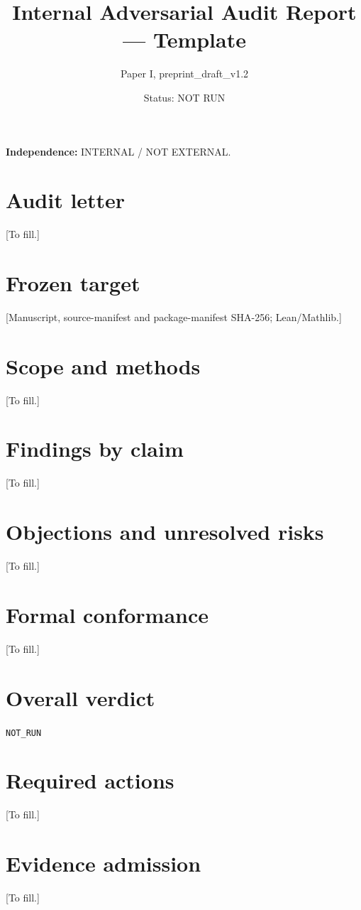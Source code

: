 \documentclass[11pt]{article}
\title{Internal Adversarial Audit Report --- Template}
\author{Paper I, preprint\_draft\_v1.2}
\date{Status: NOT RUN}
\begin{document}
\maketitle
\noindent\textbf{Independence:} INTERNAL / NOT EXTERNAL.

\section{Audit letter}
[To fill.]
\section{Frozen target}
[Manuscript, source-manifest and package-manifest SHA-256; Lean/Mathlib.]
\section{Scope and methods}
[To fill.]
\section{Findings by claim}
[To fill.]
\section{Objections and unresolved risks}
[To fill.]
\section{Formal conformance}
[To fill.]
\section{Overall verdict}
\texttt{NOT\_RUN}
\section{Required actions}
[To fill.]
\section{Evidence admission}
[To fill.]
\end{document}

